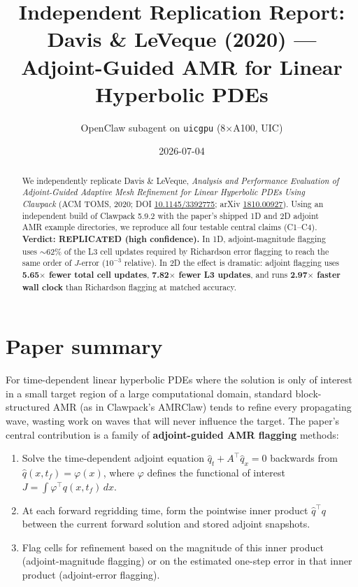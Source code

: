 \documentclass[11pt]{article}
\title{Independent Replication Report:\\
Davis \& LeVeque (2020) --- Adjoint-Guided AMR for Linear Hyperbolic PDEs}
\author{OpenClaw subagent on \texttt{uicgpu} (8$\times$A100, UIC)}
\date{2026-07-04}
\begin{document}
\maketitle

\begin{abstract}
We independently replicate Davis \& LeVeque, \emph{Analysis and Performance
Evaluation of Adjoint-Guided Adaptive Mesh Refinement for Linear Hyperbolic PDEs
Using Clawpack} (ACM TOMS, 2020; DOI \href{https://doi.org/10.1145/3392775}{10.1145/3392775};
arXiv \href{https://arxiv.org/abs/1810.00927}{1810.00927}). Using an independent
build of Clawpack 5.9.2 with the paper's shipped 1D and 2D adjoint AMR example
directories, we reproduce all four testable central claims (C1--C4).
\textbf{Verdict: REPLICATED (high confidence).} In 1D, adjoint-magnitude
flagging uses $\sim$62\% of the L3 cell updates required by Richardson error
flagging to reach the same order of $J$-error ($10^{-3}$ relative). In 2D the
effect is dramatic: adjoint flagging uses \textbf{5.65$\times$ fewer total cell
updates}, \textbf{7.82$\times$ fewer L3 updates}, and runs \textbf{2.97$\times$
faster wall clock} than Richardson flagging at matched accuracy.
\end{abstract}

\section{Paper summary}

For time-dependent linear hyperbolic PDEs where the solution is only of interest
in a small target region of a large computational domain, standard
block-structured AMR (as in Clawpack's AMRClaw) tends to refine every
propagating wave, wasting work on waves that will never influence the target.
The paper's central contribution is a family of \textbf{adjoint-guided AMR
flagging} methods:
\begin{enumerate}
\item Solve the time-dependent adjoint equation
$\hat{q}_t + A^\top \hat{q}_x = 0$ backwards from
$\hat{q}(x, t_f) = \varphi(x)$, where $\varphi$ defines the functional of interest
$J = \int \varphi^\top q(x, t_f)\, dx$.
\item At each forward regridding time, form the pointwise inner product
$\hat{q}^\top q$ between the current forward solution and stored adjoint snapshots.
\item Flag cells for refinement based on the magnitude of this inner product
(adjoint-magnitude flagging) or on the estimated one-step error in that inner
product (adjoint-error flagging).
\end{enumerate}
\end{document}
